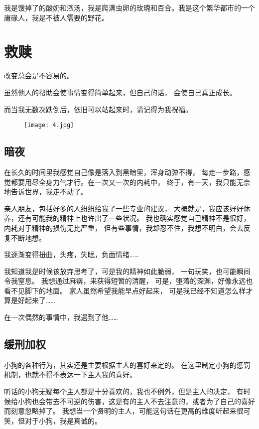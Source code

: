 \documentclass[cn,12pt]{elegantbook}
\begin{document}
我是馊掉了的酸奶和浓汤，我是爬满虫卵的玫瑰和百合。我是这个繁华都市的一个庸碌人，我是不被人需要的野花。




\chapter{救赎}
改变总会是不容易的。

虽然他人的帮助会使事情变得简单起来，但自己的话，
会使自己真正成长。

而当我无数次跌倒后，依旧可以站起来时，请记得为我祝福。

\vspace{8em}
\begin{figure}[H]
  \texttt{[image: 4.jpg]} 
\end{figure}  


\newpage
\section{暗夜}
 
在长久的时间里我感觉自己像是落入到黑暗里，浑身动弹不得，
   每走一步路，感觉都要用尽全身力气才行。在一次又一次的内耗中，
   终于，有一天，我只能无奈地告诉世界，我走不动了。

   亲人朋友，包括好多的人纷纷给我了一些专业的建议，
   大概就是，我应该好好休养，还有可能我的精神上也许出了一些状况。
   我也确实感觉自己精神不是很好，内耗对于精神的损伤无比严重，
   但有些事情，我却忍不住，我想不明白，会去反复不断地想。
   
   我逐渐变得扭曲，头疼，失眠，负面情绪……

   我知道我是时候该放弃思考了，可是我的精神如此脆弱，
   一句玩笑，也可能瞬间令我窒息。
   我想通过麻痹，来获得短暂的清醒，
   可是，堕落的深渊，好像永远也看不见脚下的地面。
   家人虽然希望我能早点好起来，
   可是我已经不知道怎么样才算是好起来了……

   在一次偶然的事情中，我遇到了他……

   
\newpage
\section{缓刑加权}
小狗的各种行为，其实还是主要根据主人的喜好来定的。
在这里制定小狗的惩罚机制，也就不得不表达一下主人我的喜好。

听话的小狗无疑每个主人都是十分喜欢的，我也不例外，但是主人的决定，
有时候给小狗也会带去不可逆的伤害，这是有的主人不去注意的，或者为了自己的喜好而刻意忽略掉了。
我想当一个贤明的主人，可能这句话在更高的维度听起来很可笑，但对于小狗，我是真诚的。
\end{document}
